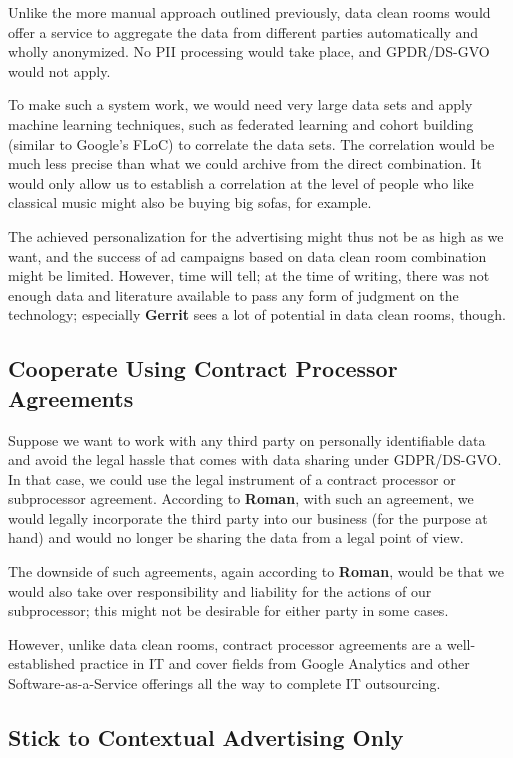 Unlike the more manual approach outlined previously, data clean rooms would offer a service to aggregate the data from different parties automatically and wholly anonymized. No PII processing would take place, and GPDR/DS-GVO would not apply.

To make such a system work, we would need very large data sets and apply machine learning techniques, such as federated learning and cohort building (similar to Google's FLoC) to correlate the data sets. The correlation would be much less precise than what we could archive from the direct combination. It would only allow us to establish a correlation at the level of people who like classical music might also be buying big sofas, for example.

The achieved personalization for the advertising might thus not be as high as we want, and the success of ad campaigns based on data clean room combination might be limited. However, time will tell; at the time of writing, there was not enough data and literature available to pass any form of judgment on the technology; especially \textbf{Gerrit} sees a lot of potential in data clean rooms, though.

\subsection{Cooperate Using Contract Processor Agreements}

Suppose we want to work with any third party on personally identifiable data and avoid the legal hassle that comes with data sharing under GDPR/DS-GVO. In that case, we could use the legal instrument of a contract processor or subprocessor agreement. According to \textbf{Roman}, with such an agreement, we would legally incorporate the third party into our business (for the purpose at hand) and would no longer be sharing the data from a legal point of view.

The downside of such agreements, again according to \textbf{Roman}, would be that we would also take over responsibility and liability for the actions of our subprocessor; this might not be desirable for either party in some cases.

However, unlike data clean rooms, contract processor agreements are a well-established practice in IT and cover fields from Google Analytics and other Software-as-a-Service offerings all the way to complete IT outsourcing.

\subsection{Stick to Contextual Advertising Only}

